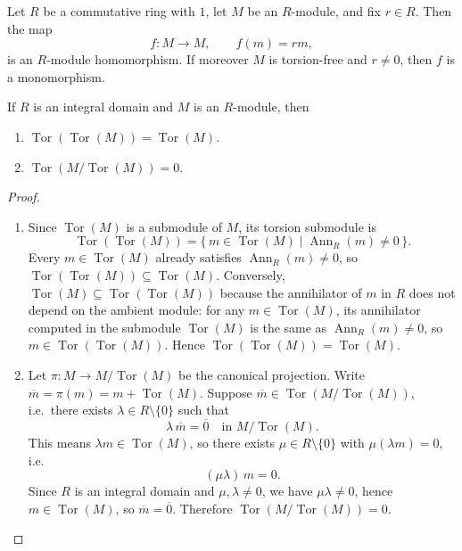 \begin{remark}
    Let $R$ be a commutative ring with $1$, let $M$ be an $R$-module, and fix $r\in R$. Then the map
    \[
        f\colon M \to M, \qquad f(m)=rm,
    \]
    is an $R$-module homomorphism. If moreover $M$ is torsion-free and $r\neq 0$, then $f$ is a monomorphism.
\end{remark}

\begin{lemma}
    If $R$ is an integral domain and $M$ is an $R$-module, then
    \begin{enumerate}
        \item $\operatorname{Tor}(\operatorname{Tor}(M)) = \operatorname{Tor}(M)$.
        \item $\operatorname{Tor}(M/\operatorname{Tor}(M)) = 0$.
    \end{enumerate}
\end{lemma}

\begin{proof}\leavevmode
    \begin{enumerate}
        \item
              Since $\operatorname{Tor}(M)$ is a submodule of $M$, its torsion submodule is
              \[
                  \operatorname{Tor}(\operatorname{Tor}(M))
                  = \{\, m\in\operatorname{Tor}(M) \mid \operatorname{Ann}_R(m)\neq 0 \,\}.
              \]
              Every $m\in\operatorname{Tor}(M)$ already satisfies $\operatorname{Ann}_R(m)\neq 0$,
              so $\operatorname{Tor}(\operatorname{Tor}(M)) \subseteq \operatorname{Tor}(M)$.
              Conversely, $\operatorname{Tor}(M)\subseteq\operatorname{Tor}(\operatorname{Tor}(M))$ because the annihilator of $m$ in $R$ does not depend on the ambient module:
              for any $m\in\operatorname{Tor}(M)$, its annihilator computed in the submodule $\operatorname{Tor}(M)$ is the same as $\operatorname{Ann}_R(m)\neq 0$,
              so $m\in\operatorname{Tor}(\operatorname{Tor}(M))$.
              Hence $\operatorname{Tor}(\operatorname{Tor}(M))=\operatorname{Tor}(M)$.

        \item
              Let $\pi\colon M\to M/\operatorname{Tor}(M)$ be the canonical projection.
              Write $\overline{m}=\pi(m)=m+\operatorname{Tor}(M)$.
              Suppose $\overline{m}\in\operatorname{Tor}(M/\operatorname{Tor}(M))$,
              i.e.\ there exists $\lambda\in R\setminus\{0\}$ such that
              \[
                  \lambda\,\overline{m} = \overline{0} \quad\text{in } M/\operatorname{Tor}(M).
              \]
              This means $\lambda m\in\operatorname{Tor}(M)$,
              so there exists $\mu\in R\setminus\{0\}$ with $\mu(\lambda m)=0$, i.e.
              \[
                  (\mu\lambda)\,m = 0.
              \]
              Since $R$ is an integral domain and $\mu,\lambda\neq 0$, we have $\mu\lambda\neq 0$,
              hence $m\in\operatorname{Tor}(M)$, so $\overline{m}=\overline{0}$.
              Therefore $\operatorname{Tor}(M/\operatorname{Tor}(M))=0$.
    \end{enumerate}
\end{proof}

